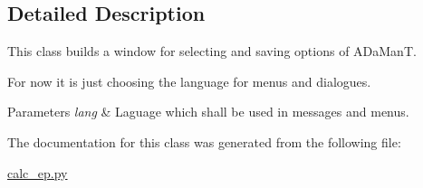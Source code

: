 \subsection{Detailed Description}
This class builds a window for selecting and saving options of A\+Da\+ManT. 

For now it is just choosing the language for menus and dialogues. 
\begin{DoxyParams}{Parameters}
{\em lang} & Laguage which shall be used in messages and menus. \\
\hline
\end{DoxyParams}


The documentation for this class was generated from the following file\+:\begin{DoxyCompactItemize}
\item 
\hyperlink{calc__ep_8py}{calc\+\_\+ep.\+py}\end{DoxyCompactItemize}
